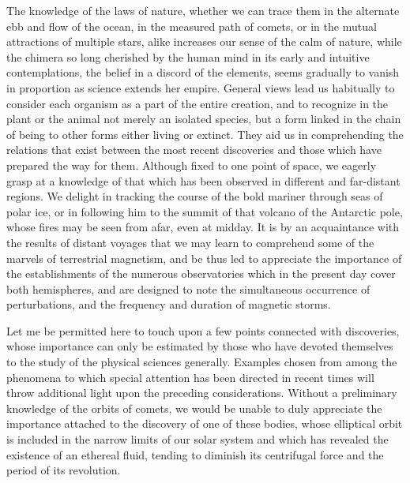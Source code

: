 The knowledge of the laws of nature, whether we can trace them in the alternate ebb and flow of the ocean, in the measured path of comets, or in the mutual attractions of multiple stars, alike increases our sense of the calm of nature, while the chimera so long cherished by the human mind in its early and intuitive contemplations, the belief in a discord of the elements, seems gradually to vanish in proportion as science extends her empire. General views lead us habitually to consider each organism as a part of the entire creation, and to recognize in the plant or the animal not merely an isolated species, but a form linked in the chain of being to other forms either living or extinct. They aid us in comprehending the relations that exist between the most recent discoveries and those which have prepared the way for them. Although fixed to one point of space, we eagerly grasp at a knowledge of that which has been observed in different and far-distant regions. We delight in tracking the course of the bold mariner through seas of polar ice, or in following him to the summit of that volcano of the Antarctic pole, whose fires may be seen from afar, even at midday. It is by an acquaintance with the results of distant voyages that we may learn to comprehend some of the marvels of terrestrial magnetism, and be thus led to appreciate the importance of the establishments of the numerous observatories which in the present day cover both hemispheres, and are designed to note the simultaneous occurrence of perturbations, and the frequency and duration of magnetic storms.

Let me be permitted here to touch upon a few points connected with discoveries, whose importance can only be estimated by those who have devoted themselves to the study of the physical sciences generally. Examples chosen from among the phenomena to which special attention has been directed in recent times will throw additional light upon the preceding considerations. Without a preliminary knowledge of the orbits of comets, we would be unable to duly appreciate the importance attached to the discovery of one of these bodies, whose elliptical orbit is included in the narrow limits of our solar system and which has revealed the existence of an ethereal fluid, tending to diminish its centrifugal force and the period of its revolution.

